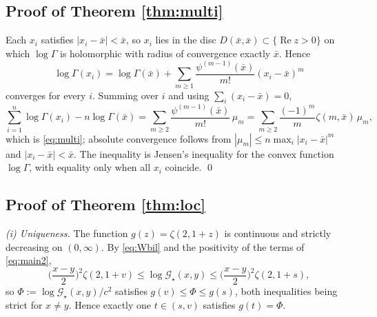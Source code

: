 \documentclass[11pt,a4paper]{amsart}
\theoremstyle{definition}
\newcommand{\Gs}{\mathcal{G}_{\star}}
\begin{document}
\subsection{Proof of Theorem \ref{thm:multi}}
Each $x_{i}$ satisfies $|x_{i}-\bar x|<\bar x$, so $x_{i}$ lies in the disc
$D(\bar x,\bar x)\subset\{\operatorname{Re}z>0\}$ on which $\log\Gamma$ is holomorphic with
radius of convergence exactly $\bar x$. Hence
\[
  \log\Gamma(x_{i})=\log\Gamma(\bar x)+\sum_{m\ge1}\frac{\psi^{(m-1)}(\bar x)}{m!}
   (x_{i}-\bar x)^{m}
\]
converges for every $i$. Summing over $i$ and using $\sum_{i}(x_{i}-\bar x)=0$,
\[
  \sum_{i=1}^{n}\log\Gamma(x_{i})-n\log\Gamma(\bar x)
  =\sum_{m\ge2}\frac{\psi^{(m-1)}(\bar x)}{m!}\,\mu_{m}
  =\sum_{m\ge2}\frac{(-1)^{m}}{m}\zeta(m,\bar x)\,\mu_{m},
\]
which is \eqref{eq:multi}; absolute convergence follows from
$|\mu_{m}|\le n\max_{i}|x_{i}-\bar x|^{m}$ and $|x_{i}-\bar x|<\bar x$. The inequality is
Jensen's inequality for the convex function $\log\Gamma$, with equality only when all
$x_{i}$ coincide. \qed

\subsection{Proof of Theorem \ref{thm:loc}}

\emph{(i) Uniqueness.} The function $g(z)=\zeta(2,1+z)$ is continuous and strictly decreasing
on $(0,\infty)$. By \eqref{eq:Wbil} and the positivity of the terms of \eqref{eq:main2},
\[
  \Big(\frac{x-y}{2}\Big)^{2}\zeta(2,1+v)\le\log\Gs(x,y)\le
  \Big(\frac{x-y}{2}\Big)^{2}\zeta(2,1+s),
\]
so $\Phi:=\log\Gs(x,y)/c^{2}$ satisfies $g(v)\le\Phi\le g(s)$, both inequalities being
strict for $x\ne y$. Hence exactly one $t\in(s,v)$ satisfies $g(t)=\Phi$.
\end{document}
